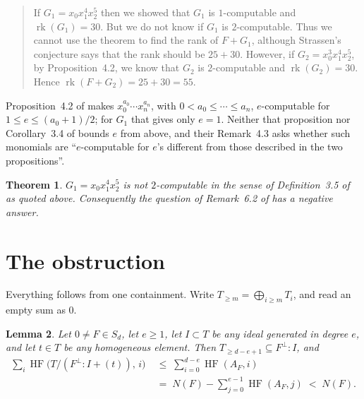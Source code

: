 \documentclass[11pt]{amsart}
\newtheorem{theorem}{Theorem}
\newtheorem{lemma}[theorem]{Lemma}
\theoremstyle{remark}
\theoremstyle{definition}
\DeclareMathOperator{\rk}{rk}
\DeclareMathOperator{\HF}{HF}
\newcommand{\perpp}{^{\perp}}
\begin{document}
\begin{quote}
If $G_1=x_0x_1^4x_2^5$ then we showed that $G_1$ is $1$-computable and $\rk(G_1)=30$. But we do
not know if $G_1$ is $2$-computable. Thus we cannot use the theorem to find the rank of $F+G_1$,
although Strassen's conjecture says that the rank should be $25+30$. However, if
$G_2=x_0^3x_1^4x_2^5$, by Proposition~4.2, we know that $G_2$ is $2$-computable and
$\rk(G_2)=30$. Hence $\rk(F+G_2)=25+30=55$.
\end{quote}

\noindent
Proposition~4.2 of \cite{CCCGW} makes $x_0^{a_0}\cdots x_n^{a_n}$, with $0<a_0\le\cdots\le a_n$,
$e$-computable for $1\le e\le(a_0+1)/2$; for $G_1$ that gives only $e=1$. Neither that
proposition nor Corollary~3.4 of \cite{CCCGW} bounds $e$ from above, and their Remark~4.3 asks
whether such monomials are ``$e$-computable for $e$'s different from those described in the two
propositions''.

\begin{theorem}\label{thm:main}
$G_1=x_0x_1^4x_2^5$ is not $2$-computable in the sense of Definition~3.5 of \cite{CCCGW} as
quoted above. Consequently the question of Remark~6.2 of \cite{CCCGW} has a negative answer.
\end{theorem}

\section{The obstruction}

Everything follows from one containment. Write $T_{\ge m}=\bigoplus_{i\ge m}T_i$, and read an
empty sum as $0$.

\begin{lemma}\label{lem:main}
Let $0\ne F\in S_d$, let $e\ge1$, let $I\subset T$ be \emph{any} ideal generated in degree $e$,
and let $t\in T$ be \emph{any} homogeneous element. Then $T_{\ge d-e+1}\subseteq F\perpp:I$, and
\begin{equation}\label{eq:cap}
\begin{aligned}
 \sum_i\HF\bigl(T/(F\perpp:I+(t)),\,i\bigr)
 &\;\le\;\sum_{i=0}^{d-e}\HF(A_F,i)\\
 &\;=\;N(F)-\sum_{j=0}^{e-1}\HF(A_F,j)\;<\;N(F).
\end{aligned}
\end{equation}
\end{lemma}
\end{document}
